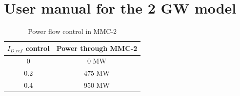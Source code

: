\chapter{User manual for the 2 GW model}

 \begin{table}[H]
 \centering
\begin{tabular}{|c|c|}
\hline
\textbf{$I_{D\_ref}$ control} & \textbf{Power through MMC-2} \\ \hline
0                    & 0 MW                         \\ \hline
0.2                  & 475 MW                       \\ \hline
0.4                  & 950 MW                       \\ \hline
\end{tabular}
\caption{Power flow control in MMC-2}
\label{tab:Power_flow_control_in_MMC-2}
\end{table}


